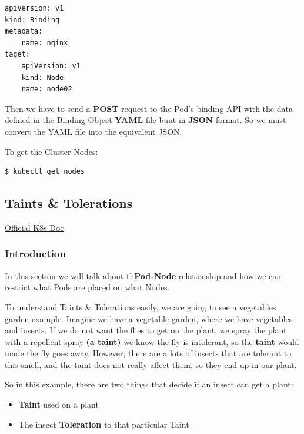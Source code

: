 \documentclass{article}
\newenvironment{codetemplate}[1][]{%
  \mybasecolorbox[#1]
  \itshape
}{%
  \endmybasecolorbox
}
\begin{document}
\begin{codetemplate}{}
\begin{verbatim}
apiVersion: v1
kind: Binding
metadata:
    name: nginx
taget:
    apiVersion: v1
    kind: Node
    name: node02
\end{verbatim}
\end{codetemplate}

Then we have to send a \textbf{POST} request to the Pod's binding API with the data defined in the Binding Object \textbf{YAML} file buut in \textbf{JSON} format. So we must convert the YAML file into the equivalent JSON.

To get the Cluster Nodes:

\begin{codetemplate}{}
\begin{verbatim}
$ kubectl get nodes
\end{verbatim}
\end{codetemplate}

\subsection{Taints \& Tolerations}

\href{https://kubernetes.io/docs/concepts/scheduling-eviction/taint-and-toleration/}{Official K8s Doc}

\subsubsection{Introduction}

In this section we will talk about th\textbf{Pod-Node} relationship and how we can restrict what Pods are placed on what Nodes. 

To understand Taints \& Tolerations easily, we are going to see a vegetables garden example. Imagine we have a vegetable garden, where we have vegetables and insects. If we do not want the flies to get on the plant, we spray the plant with a repellent spray \textbf{(a taint)} we know the fly is intolerant, so the \textbf{taint} would made the fly goes away. However, there are a lots of insects that are tolerant to this smell, and the taint does not really affect them, so they end up in our plant.

So in this example, there are two things that decide if an insect can get a plant:

\begin{itemize}
    \item \textbf{Taint} used on a plant
    \item The insect \textbf{Toleration} to that particular Taint
\end{itemize}
\end{document}
